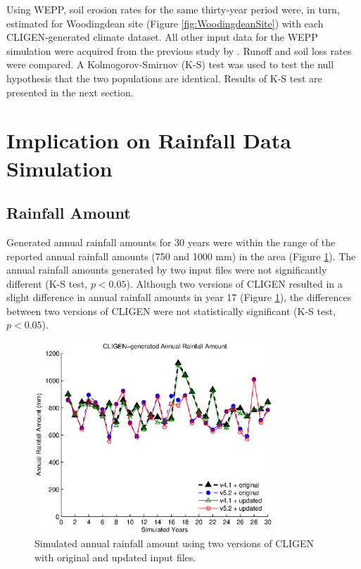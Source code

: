 Using WEPP, soil erosion rates for the same thirty-year period were, in turn,
estimated for Woodingdean site (Figure \ref{fig:WoodingdeanSite}) with each
CLIGEN-generated climate dataset. All other input data for the WEPP simulation
were acquired from the previous study by \citet{favis-mortlock1998-141}. Runoff
and soil loss rates were compared.
A Kolmogorov-Smirnov (K-S) test was used to test the null hypothesis that the
two
populations are identical. Results of K-S test are presented in the next
section.

\section{Implication on Rainfall Data Simulation}
\label{sec:RainfallSimulation}

\subsection{Rainfall Amount}
Generated annual rainfall amounts for 30 years were within the range of the
reported annual rainfall amounts (750 and 1000 mm) in the area (Figure
\ref{fig:cligen_annual_amount}). The annual rainfall amounts generated by two
input files were not significantly different (K-S test, $p<0.05$). Although two
versions of CLIGEN resulted in a slight difference in annual rainfall amounts in
year 17 (Figure \ref{fig:cligen_annual_amount}), the differences between two
versions of CLIGEN were not statistically significant (K-S test, $p<0.05$).

\begin{figure}[htbp]
  \centering
   \includegraphics[width=0.8\textwidth]{./img/cligen_annual_amount_series}
  \caption{Simulated annual rainfall amount using two versions of CLIGEN with
original and updated input files.}
  \label{fig:cligen_annual_amount}
\end{figure}


